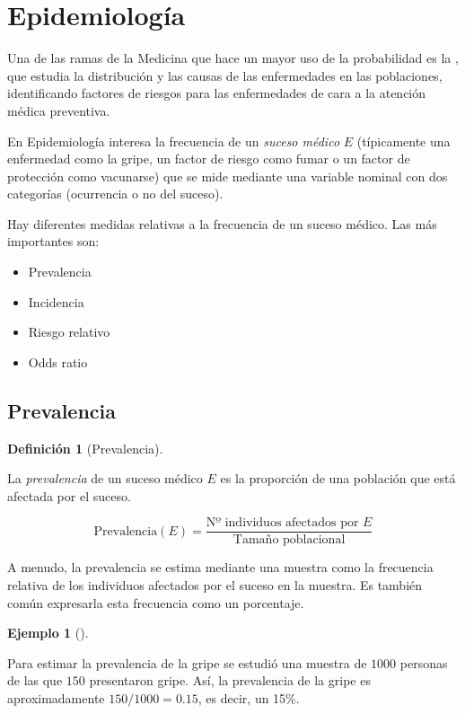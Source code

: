 \documentclass[
  spanish,
  a4paper,
]{scrreport}
\providecommand{\tightlist}{%
  \setlength{\itemsep}{0pt}\setlength{\parskip}{0pt}}
\theoremstyle{plain}
\theoremstyle{definition}
\newtheorem{example}{Ejemplo}[chapter]
\theoremstyle{definition}
\newtheorem{definition}{Definición}[chapter]
\theoremstyle{remark}
\begin{document}
\section{Epidemiología}\label{epidemiologuxeda}

Una de las ramas de la Medicina que hace un mayor uso de la probabilidad
es la , que estudia la distribución y las causas de las enfermedades en
las poblaciones, identificando factores de riesgos para las enfermedades
de cara a la atención médica preventiva.

En Epidemiología interesa la frecuencia de un \emph{suceso médico} \(E\)
(típicamente una enfermedad como la gripe, un factor de riesgo como
fumar o un factor de protección como vacunarse) que se mide mediante una
variable nominal con dos categorías (ocurrencia o no del suceso).

Hay diferentes medidas relativas a la frecuencia de un suceso médico.
Las más importantes son:

\begin{itemize}
\tightlist
\item
  Prevalencia
\item
  Incidencia
\item
  Riesgo relativo
\item
  Odds ratio
\end{itemize}

\subsection{Prevalencia}\label{prevalencia}

\begin{definition}[Prevalencia]\protect\hypertarget{def-prevalencia}{}\label{def-prevalencia}

La \emph{prevalencia} de un suceso médico \(E\) es la proporción de una
población que está afectada por el suceso.

\[\mbox{Prevalencia}(E) = \frac{\mbox{Nº individuos afectados por $E$}}{\mbox{Tamaño poblacional}}\]

\end{definition}

A menudo, la prevalencia se estima mediante una muestra como la
frecuencia relativa de los individuos afectados por el suceso en la
muestra. Es también común expresarla esta frecuencia como un porcentaje.

\begin{example}[]\protect\hypertarget{exm-prevalencia}{}\label{exm-prevalencia}

Para estimar la prevalencia de la gripe se estudió una muestra de
\(1000\) personas de las que \(150\) presentaron gripe. Así, la
prevalencia de la gripe es aproximadamente \(150/1000=0.15\), es decir,
un 15\%.

\end{example}
\end{document}
